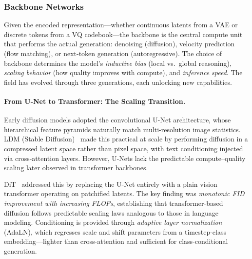 \subsubsection{Backbone Networks}
\label{sec:arch_backbone}

Given the encoded representation---whether continuous latents from a VAE or discrete tokens from a VQ codebook---the backbone is the central compute unit that performs the actual generation: denoising (diffusion), velocity prediction (flow matching), or next-token generation (autoregressive). The choice of backbone determines the model's \emph{inductive bias} (local vs.\ global reasoning), \emph{scaling behavior} (how quality improves with compute), and \emph{inference speed}. The field has evolved through three generations, each unlocking new capabilities.

\paragraph{From U-Net to Transformer: The Scaling Transition.}
Early diffusion models adopted the convolutional U-Net architecture, whose hierarchical feature pyramids naturally match multi-resolution image statistics. LDM (Stable Diffusion)~\citep{rombach2022stablediffusion} made this practical at scale by performing diffusion in a compressed latent space rather than pixel space, with text conditioning injected via cross-attention layers. However, U-Nets lack the predictable compute--quality scaling later observed in transformer backbones.

DiT~\citep{peebles2023scalable} addressed this by replacing the U-Net entirely with a plain vision transformer operating on patchified latents. The key finding was \emph{monotonic FID improvement with increasing FLOPs}, establishing that transformer-based diffusion follows predictable scaling laws analogous to those in language modeling. Conditioning is provided through \emph{adaptive layer normalization} (AdaLN), which regresses scale and shift parameters from a timestep-class embedding---lighter than cross-attention and sufficient for class-conditional generation.

